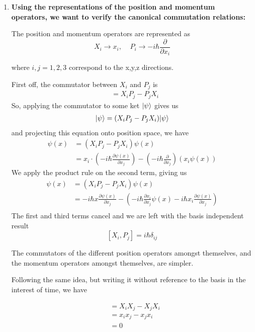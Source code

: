 \documentclass[twoside]{article}
\begin{document}
\begin{enumerate}
   \item \textbf{Using the representations of the position and momentum operators, we want to verify the canonical commutation relations:}
   
   The position and momentum operators are represented as 
   \[ X_i \rightarrow x_i, \;\;\;\;  P_i \rightarrow -i\hbar\frac{\partial}{\partial x_i} \]

   where $i,j = 1,2,3$ correspond to the x,y,z directions.
   \vskip 1cm


   First off, the commutator between $X_i$ and $P_j$ is
   \begin{align*}
      [X_i, P_j] &= X_i P_j - P_j X_i 
   \end{align*}
   So, applying the commutator to some ket $\rvert\psi\rangle$ gives us 
   \begin{align*}
      [X_i, P_j]\ket{\psi} &= (X_i P_j - P_j X_i ) \ket{\psi} \\
   \end{align*}
   and projecting this equation onto position space, we have
   \begin{align*}
      [X_i, P_j]\psi(x) &= (X_i P_j - P_j X_i ) \psi(x) \\
      &= x_i \cdot \left(-i\hbar \frac{\partial \psi(x)}{\partial x_j} \right) - \left(-i\hbar \frac{\partial}{\partial x_j} \right)(x_i\psi(x))
   \end{align*}
   We apply the product rule on the second term, giving us 
   \begin{align*}
      [X_i, P_j]\psi(x) &= (X_i P_j - P_j X_i ) \psi(x) \\
      &= -i\hbar x \frac{\partial \psi(x)}{\partial x_j}  - \left(-i\hbar \frac{\partial x_i}{\partial x_j} \psi(x) - i\hbar x_i \frac{\partial \psi(x)}{\partial x_j}  \right) \\
   \end{align*}
   The first and third terms cancel and we are left with the basis independent result
   \[ \boxed{[X_i, P_j] = i\hbar \delta_{ij}} \]

   The commutators of the different position operators amongst themselves, and the momentum operators amongst themselves, are simpler.

   Following the same idea, but writing it without reference to the basis in the interest of time, we have

   \begin{align*}
      [X_i, X_j] &= X_i X_j - X_j X_i \\
      &= x_i x_j - x_j x_i \\
      &= 0
   \end{align*}


\end{enumerate}
\end{document}
